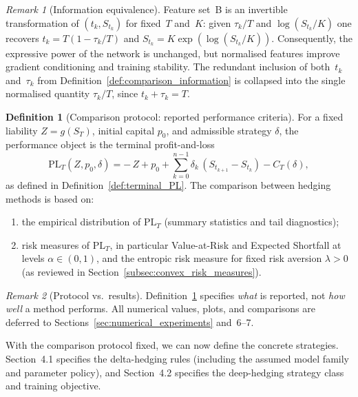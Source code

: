 \documentclass[12pt,a4paper]{article}
\theoremstyle{definition}
\newtheorem{definition}{Definition}[section]
\theoremstyle{plain}
\theoremstyle{remark}
\newtheorem{remark}{Remark}[section]
\theoremstyle{plain}
\begin{document}
\begin{remark}[Information equivalence]\label{rem:information_equivalence}
Feature set~B is an invertible transformation of $(t_k, S_{t_k})$
for fixed~$T$ and~$K$: given $\tau_k/T$ and $\log(S_{t_k}/K)$ one recovers
$t_k = T(1 - \tau_k/T)$ and $S_{t_k} = K \exp(\log(S_{t_k}/K))$.
Consequently, the expressive power of the network is unchanged, but
normalised features improve gradient conditioning and training stability.
The redundant inclusion of both~$t_k$ and~$\tau_k$ from
Definition~\ref{def:comparison_information} is collapsed into the single
normalised quantity $\tau_k/T$, since $t_k + \tau_k = T$.
\end{remark}

\begin{definition}[Comparison protocol: reported performance criteria]
\label{def:comparison_metrics}
For a fixed liability $Z=g(S_T)$, initial capital $p_0$, and admissible strategy $\delta$, the performance object is the terminal profit-and-loss
\[
\mathrm{PL}_T(Z,p_0,\delta)
=
-\,Z + p_0 + \sum_{k=0}^{n-1} \delta_k\,(S_{t_{k+1}}-S_{t_k}) - C_T(\delta),
\]
as defined in Definition~\ref{def:terminal_PL}.
The comparison between hedging methods is based on:
\begin{enumerate}
\item the empirical distribution of $\mathrm{PL}_T$ (summary statistics and tail diagnostics);
\item risk measures of $\mathrm{PL}_T$, in particular Value-at-Risk and Expected Shortfall at levels $\alpha\in(0,1)$, and the entropic risk measure for fixed risk aversion $\lambda>0$ (as reviewed in Section~\ref{subsec:convex_risk_measures}).
\end{enumerate}
\end{definition}

\begin{remark}[Protocol vs.\ results]
\label{rem:protocol_vs_results}
Definition~\ref{def:comparison_metrics} specifies \emph{what} is reported, not \emph{how well} a method performs.
All numerical values, plots, and comparisons are deferred to Sections~\ref{sec:numerical_experiments} and~6--7.
\end{remark}

\medskip

\noindent
With the comparison protocol fixed, we can now define the concrete strategies.
Section~4.1 specifies the delta-hedging rules (including the assumed model family and parameter policy), and Section~4.2 specifies the deep-hedging strategy class and training objective.
\end{document}
